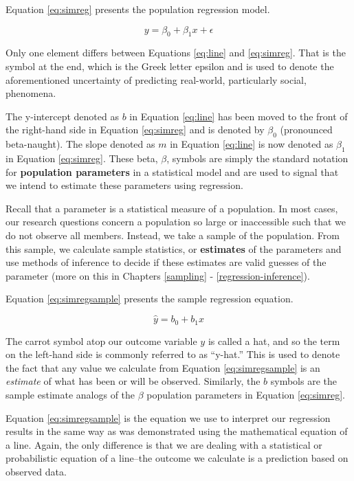 \documentclass[
]{book}
\begin{document}
Equation \eqref{eq:simreg} presents the population regression model.

\begin{equation}
y=\beta_0+\beta_1x+\epsilon
\label{eq:simreg}
\end{equation}

Only one element differs between Equations \eqref{eq:line} and \eqref{eq:simreg}. That is the symbol at the end, which is the Greek letter epsilon and is used to denote the aforementioned uncertainty of predicting real-world, particularly social, phenomena.

The y-intercept denoted as \(b\) in Equation \eqref{eq:line} has been moved to the front of the right-hand side in Equation \eqref{eq:simreg} and is denoted by \(\beta_0\) (pronounced beta-naught). The slope denoted as \(m\) in Equation \eqref{eq:line} is now denoted as \(\beta_1\) in Equation \eqref{eq:simreg}. These beta, \(\beta\), symbols are simply the standard notation for \textbf{population parameters} in a statistical model and are used to signal that we intend to estimate these parameters using regression.

Recall that a parameter is a statistical measure of a population. In most cases, our research questions concern a population so large or inaccessible such that we do not observe all members. Instead, we take a sample of the population. From this sample, we calculate sample statistics, or \textbf{estimates} of the parameters and use methods of inference to decide if these estimates are valid guesses of the parameter (more on this in Chapters \ref{sampling} - \ref{regression-inference}).

Equation \eqref{eq:simregsample} presents the sample regression equation.

\begin{equation}
\hat{y}=b_0+b_1x
\label{eq:simregsample}
\end{equation}

The carrot symbol atop our outcome variable \(y\) is called a hat, and so the term on the left-hand side is commonly referred to as ``y-hat.'' This is used to denote the fact that any value we calculate from Equation \eqref{eq:simregsample} is an \emph{estimate} of what has been or will be observed. Similarly, the \(b\) symbols are the sample estimate analogs of the \(\beta\) population parameters in Equation \eqref{eq:simreg}.

Equation \eqref{eq:simregsample} is the equation we use to interpret our regression results in the same way as was demonstrated using the mathematical equation of a line. Again, the only difference is that we are dealing with a statistical or probabilistic equation of a line--the outcome we calculate is a prediction based on observed data.
\end{document}

